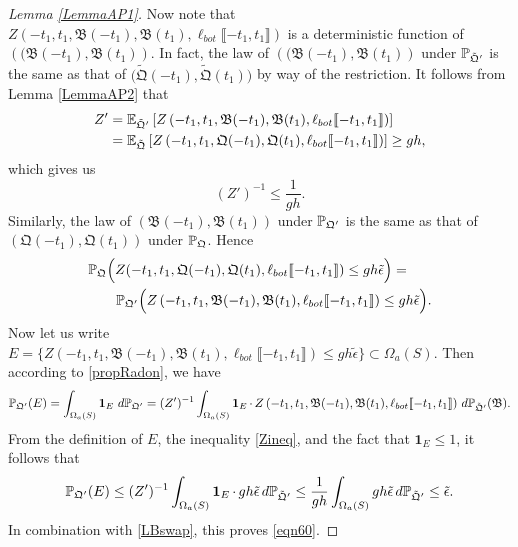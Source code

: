 \begin{proof}[Lemma \ref{LemmaAP1}]
	Now note that $Z\left(-t_1, t_1, \mathfrak B(-t_1), \mathfrak B(t_1), \ell_{bot}\llbracket -t_1, t_1\rrbracket\right)$ is a deterministic function of $\left((\mathfrak B(-t_1), \mathfrak B(t_1)\right)$. In fact, the law of $\left((\mathfrak B(-t_1), \mathfrak B(t_1)\right)$ under $\mathbb{P}_{\tilde{\mathfrak{Q}}'}$ is the same as that of $\big(\tilde{\mathfrak{Q}}(-t_1), \tilde{\mathfrak{Q}}(t_1)\big)$ by way of the restriction. It follows from Lemma \ref{LemmaAP2} that
	\begin{align*}
		Z' &= \mathbb{E}_{\tilde{\mathfrak{Q}}'}\left[Z\left(-t_1, t_1, \mathfrak B(-t_1), \mathfrak B(t_1), \ell_{bot}\llbracket -t_1, t_1\rrbracket\right)\right]\\
		&= \mathbb{E}_{\tilde{\mathfrak{Q}}}\left[Z\left(-t_1, t_1, \mathfrak{Q}(-t_1), \mathfrak{Q}(t_1), \ell_{bot}\llbracket -t_1, t_1\rrbracket\right)\right]\geq gh,
	\end{align*}	
	which gives us 
	\begin{equation}
		\label{Zineq} (Z')^{-1}\leq \frac{1}{gh}.
	\end{equation}
	Similarly,  the law of $\left(\mathfrak B(-t_1), \mathfrak{B}(t_1)\right)$ under $\mathbb{P}_{\mathfrak{Q}'}$ is the same as that of $\left(\mathfrak{Q}(-t_1), \mathfrak{Q}(t_1)\right)$ under $\mathbb{P}_{\mathfrak{Q}}$. Hence
	\begin{equation}\label{LBswap}
		\begin{split}
			&\mathbb{P}_{\mathfrak{Q}}\Big(Z(-t_1, t_1, \mathfrak{Q}(-t_1), \mathfrak{Q}(t_1), \ell_{bot}\llbracket -t_1, t_1\rrbracket)\leq gh\tilde \epsilon\Big)=\\
			&\qquad\mathbb{P}_{\mathfrak{Q}'}\Big(Z\left(-t_1, t_1, \mathfrak B(-t_1), \mathfrak B(t_1), \ell_{bot}\llbracket -t_1, t_1\rrbracket\right)\leq gh\tilde \epsilon\Big).
		\end{split}
	\end{equation}
	Now let us write $E=\{Z\left(-t_1, t_1, \mathfrak B(-t_1), \mathfrak B(t_1), \ell_{bot}\llbracket -t_1, t_1\rrbracket\right)\leq gh\tilde\epsilon\}\subset \Omega_a(S)$. Then according to \eqref{propRadon}, we have
	\[
	\mathbb{P}_{\mathfrak{Q}'}(E)=\int_{\Omega_a(S)} \operatorname{\mathbf{1}}_E\, d\mathbb{P}_{\mathfrak{Q}'} = (Z')^{-1}\int_{\Omega_a(S)}\operatorname{\mathbf{1}}_E \cdot\, Z\left(-t_1, t_1, \mathfrak B(-t_1), \mathfrak B(t_1), \ell_{bot}\llbracket -t_1, t_1\rrbracket\right)\, d\mathbb{P}_{\tilde{\mathfrak{Q}}'}(\mathfrak{B}).
	\]
	From the definition of $E$, the inequality \eqref{Zineq}, and the fact that $\mathbf{1}_E \leq 1$, it follows that
	\[
	\mathbb{P}_{\mathfrak{Q}'}(E)\leq (Z')^{-1}\int_{\Omega_a(S)} \operatorname{\mathbf{1}}_E\cdot\, gh\tilde{\epsilon}\, d\mathbb{P}_{\tilde{\mathfrak{Q}}'} \leq \frac{1}{gh}\int_{\Omega_a(S)} gh\tilde\epsilon\, d\mathbb{P}_{\tilde{\mathfrak{Q}}'}\leq \tilde{\epsilon}.
	\]
	In combination with \eqref{LBswap}, this proves \eqref{eqn60}.
	
\end{proof}

